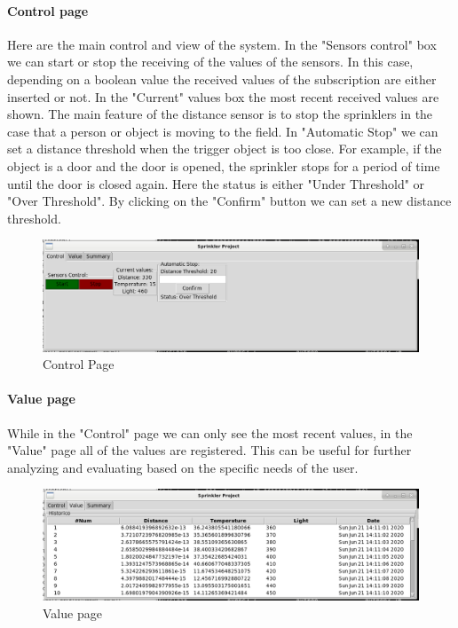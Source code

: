 \documentclass{article}
\begin{document}
\paragraph{Control page}
Here are the main control and view of the system. In the "Sensors control" box we can start or stop the receiving of the values of the sensors. In this case, depending on a boolean value the received values of the subscription are either inserted or not. In the "Current" values box the most recent received values are shown. The main feature of the distance sensor is to stop the sprinklers in the case that a person or object is moving to the field. In "Automatic Stop" we can set a distance threshold when the trigger object is too close. For example, if the object is a door and the door is opened, the sprinkler stops for a period of time until the door is closed again. Here the status is either "Under Threshold" or "Over Threshold". By clicking on the "Confirm" button we can set a new distance threshold.
\begin{figure}
\centering
\includegraphics[scale=0.3]{control_view.png}
\caption{Control Page}
\label{fig:control}
\end{figure}
\paragraph{Value page}
While in the "Control" page we can only see the most recent values, in the "Value" page all of the values are registered. This can be useful for further analyzing and evaluating based on the specific needs of the user.
\begin{figure}
\centering
\includegraphics[scale=0.3]{value_view.png}
\caption{Value page}
\label{fig:value}
\end{figure}
\end{document}
